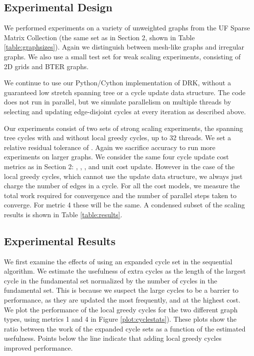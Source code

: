 \documentclass{sig-alternate}
\begin{document}
\subsection{Experimental Design}
We performed experiments on a variety of unweighted graphs
from the UF Sparse Matrix Collection
(the same set as in Section 2,
shown in Table \ref{table:graphsizes}).
Again we distinguish between mesh-like graphs and irregular graphs.
We also use a small test set for weak scaling experiments, consisting
of 2D grids and BTER graphs.

We continue to use our Python/Cython implementation of DRK,
without a guaranteed low stretch spanning
tree or a cycle update data structure.
The code does not run in parallel,
but we simulate parallelism on multiple threads by selecting and updating
edge-disjoint cycles at every iteration as described above.

Our experiments consist of two sets of strong scaling experiments,
the spanning tree cycles with and without local greedy cycles, up to
32 threads. We set a relative residual tolerance of .
Again we sacrifice accuracy to run more experiments on larger graphs.
We consider the same four cycle update cost metrics
as in Section 2: , ,
, and unit cost update.
However in the case of the local greedy cycles, which cannot use the
 update data structure, we always just
charge the number of edges in a cycle.
For all the cost models, we measure the total work required for convergence
and the number of parallel steps taken to converge. For metric 4 these
will be the same. A condensed subset of the scaling results
is shown in Table \ref{table:results}.

\subsection{Experimental Results}
We first examine the effects of using an expanded
cycle set in the sequential algorithm.
We estimate the usefulness of extra cycles
as the length of the largest cycle in the fundamental set normalized
by the number of cycles in the fundamental set. This is because
we suspect the large cycles to be a barrier to performance, as they
are updated the most frequently, and at the highest cost.
We plot the performance of the local greedy cycles
for the two different graph types, using metrics 1 and 4 in Figure
\ref{plot:cyclestats}).
These plots show the ratio between the work
of the expanded cycle sets as a function of the estimated
usefulness. Points below the line indicate that adding local greedy cycles
improved performance.
\end{document}

